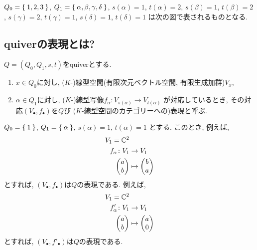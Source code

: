 \begin{example}
  \ZU
  $Q_0=\Set{1,2,3}$,
  $Q_1=\Set{\alpha,\beta,\gamma,\delta}$,
  $s(\alpha)=1$,
  $t(\alpha)=2$,
  $s(\beta)=1$,
  $t(\beta)=2$,
  $s(\gamma)=2$,
  $t(\gamma)=1$,
  $s(\delta)=1$,
  $t(\delta)=1$
  は次の図で表されるものとなる.
\end{example}



\subsection{quiverの表現とは?}
$Q=(Q_0,Q_1,s,t)$をquiverとする.
\begin{enumerate}
\item
  $x\in Q_0$に対し,
  ($K$-)線型空間(有限次元ベクトル空間, 有限生成加群)$V_x$,
\item
  $\alpha\in Q_1$に対し,
  ($K$-)線型写像$f_\alpha\colon V_{s(\alpha)} \to V_{t(\alpha)}$
  が対応しているとき,
  その対応$(V_\bullet,f_\bullet)$を$Q$び
  ($K$-線型空間のカテゴリーへの)表現と呼ぶ.
\end{enumerate}

\begin{example}
  \ZU
  $Q_0=\Set{1}$,
  $Q_1=\Set{\alpha}$,
  $s(\alpha)=1$,
  $t(\alpha)=1$
  とする.
  このとき,
  例えば,
  \begin{align*}
    V_1=\mathbb{C}^2&\\
    f_\alpha\colon V_1&\to V_1\\
    \begin{pmatrix}a\\b\end{pmatrix}
      &\mapsto
    \begin{pmatrix}b\\a\end{pmatrix}
  \end{align*}
  とすれば,
  $(V_\bullet,f_\bullet)$は$Q$の表現である.
  例えば,
  \begin{align*}
    V_1=\mathbb{C}^2&\\
    f'_\alpha\colon V_1&\to V_1\\
    \begin{pmatrix}a\\b\end{pmatrix}
      &\mapsto
    \begin{pmatrix}a\\0\end{pmatrix}
  \end{align*}
  とすれば,
  $(V_\bullet,f'_\bullet)$は$Q$の表現である.
\end{example}

